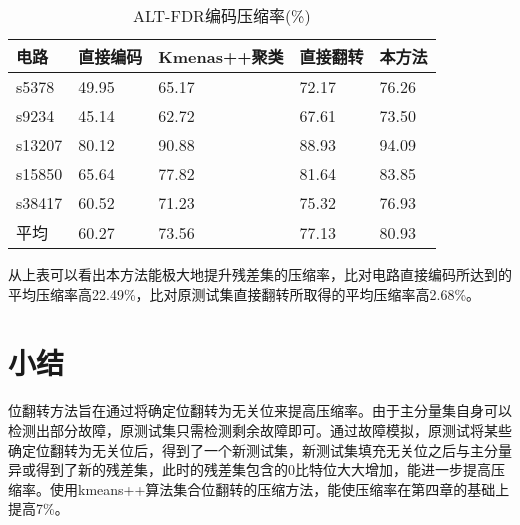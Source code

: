 \begin{table}[H]
\centering
\caption{ALT-FDR编码压缩率(\%)}\label{btabl3}
\begin{tabular}{p{2.2cm}p{2.7cm}<{\centering}p{3.3cm}<{\centering}p{2.7cm}<{\centering}p{2.7cm}<{\centering}}
\toprule
\textbf{电路}&	\textbf{直接编码}& \textbf{Kmenas++聚类}& \textbf{直接翻转}& \textbf{本方法}\\
\midrule
s5378&	49.95&	65.17&	72.17&	76.26\\
s9234&	45.14&	62.72&	67.61&	73.50\\
s13207&	80.12&	90.88&	88.93&	94.09\\
s15850&	65.64&	77.82&	81.64&	83.85\\
s38417&	60.52&	71.23&	75.32&	76.93\\
平均&	60.27&	73.56&	77.13&	80.93\\
\bottomrule
\end{tabular}
\end{table}

从上表可以看出本方法能极大地提升残差集的压缩率，比对电路直接编码所达到的平均压缩率高22.49\%，比对原测试集直接翻转所取得的平均压缩率高2.68\%。

\section{小结}
位翻转方法旨在通过将确定位翻转为无关位来提高压缩率。由于主分量集自身可以检测出部分故障，原测试集只需检测剩余故障即可。通过故障模拟，原测试将某些确定位翻转为无关位后，得到了一个新测试集，新测试集填充无关位之后与主分量异或得到了新的残差集，此时的残差集包含的0比特位大大增加，能进一步提高压缩率。使用kmeans++算法集合位翻转的压缩方法，能使压缩率在第四章的基础上提高7\%。


